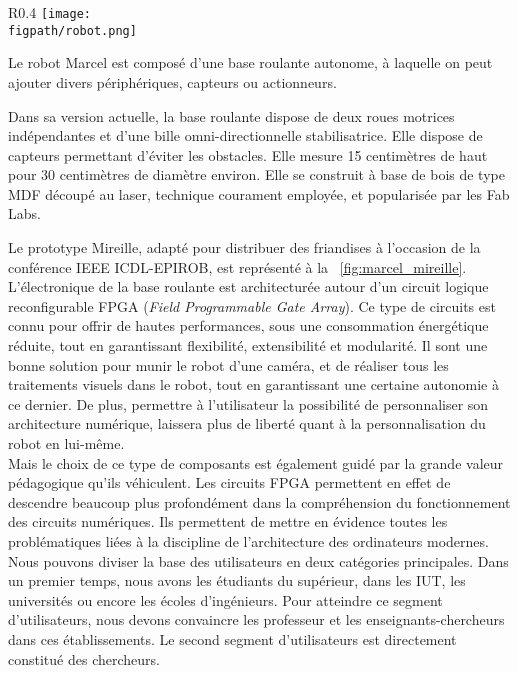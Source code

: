 \documentclass[a4paper,12pt]{report}
\newcommand{\figpath}{figures}
\begin{document}
\begin{wrapfigure}{R}{0.4\textwidth}
	\centering
	\texttt{[image: \\figpath/robot.png]}
	\caption{\label{fig:marcel_mireille}Base roulante Marcel : Prototype \og{}Mireille\fg{}.}
\end{wrapfigure}

Le robot Marcel est composé d'une base roulante autonome, à laquelle on peut ajouter divers périphériques, capteurs ou actionneurs.

Dans sa version actuelle, la base roulante dispose de deux roues motrices indépendantes et d'une bille omni-directionnelle stabilisatrice.
Elle dispose de capteurs permettant d'éviter les obstacles.
Elle mesure 15 centimètres de haut pour 30 centimètres de diamètre environ.
Elle se construit à base de bois de type MDF découpé au laser, technique courament employée, et popularisée par les Fab Labs.

Le prototype \og{}Mireille\fg{}, adapté pour distribuer des friandises à l'occasion de la conférence IEEE ICDL-EPIROB, est représenté à la \figurename~\ref{fig:marcel_mireille}.\\

L'électronique de la base roulante est architecturée autour d'un circuit logique reconfigurable FPGA (\emph{Field Programmable Gate Array}).
Ce type de circuits est connu pour offrir de hautes performances, sous une consommation énergétique réduite, tout en garantissant flexibilité, extensibilité et modularité.
Il sont une bonne solution pour munir le robot d'une caméra, et de réaliser tous les traitements visuels dans le robot, tout en garantissant une certaine autonomie à ce dernier.
De plus, permettre à l'utilisateur la possibilité de personnaliser son architecture numérique, laissera plus de liberté quant à la personnalisation du robot en lui-même.\\

Mais le choix de ce type de composants est également guidé par la grande valeur pédagogique qu'ils véhiculent.
Les circuits FPGA permettent en effet de descendre beaucoup plus profondément dans la compréhension du fonctionnement des circuits numériques.
Ils permettent de mettre en évidence toutes les problématiques liées à la discipline de l'architecture des ordinateurs modernes.\\


Nous pouvons diviser la base des utilisateurs en deux catégories principales.
Dans un premier temps, nous avons les étudiants du supérieur, dans les IUT, les universités ou encore les écoles d'ingénieurs.
Pour atteindre ce segment d'utilisateurs, nous devons convaincre les professeur et les enseignants-chercheurs dans ces établissements.
Le second segment d'utilisateurs est directement constitué des chercheurs.
\end{document}
